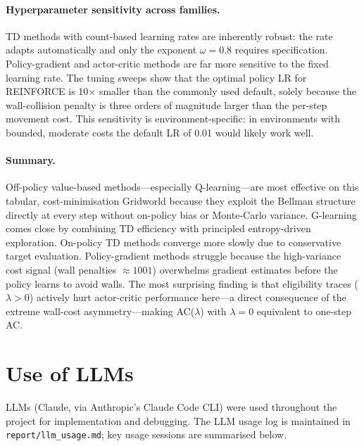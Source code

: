 \documentclass[11pt]{article}
\begin{document}
\paragraph{Hyperparameter sensitivity across families.}
TD methods with count-based learning rates are inherently robust: the rate
adapts automatically and only the exponent $\omega=0.8$ requires specification.
Policy-gradient and actor-critic methods are far more sensitive to the fixed
learning rate.  The tuning sweeps show that the optimal policy LR for REINFORCE
is 10$\times$ smaller than the commonly used default, solely because the
wall-collision penalty is three orders of magnitude larger than the per-step
movement cost.  This sensitivity is environment-specific: in environments with
bounded, moderate costs the default LR of 0.01 would likely work well.

\paragraph{Summary.}
Off-policy value-based methods—especially Q-learning—are most effective on this
tabular, cost-minimisation Gridworld because they exploit the Bellman structure
directly at every step without on-policy bias or Monte-Carlo variance.
G-learning comes close by combining TD efficiency with principled entropy-driven
exploration.  On-policy TD methods converge more slowly due to conservative
target evaluation.  Policy-gradient methods struggle because the high-variance
cost signal (wall penalties $\approx 1001$) overwhelms gradient estimates before
the policy learns to avoid walls.  The most surprising finding is that
eligibility traces ($\lambda>0$) actively hurt actor-critic performance
here---a direct consequence of the extreme wall-cost asymmetry---making
AC($\lambda$) with $\lambda=0$ equivalent to one-step AC.

\section{Use of LLMs}
\label{sec:llm}

LLMs (Claude, via Anthropic's Claude Code CLI) were used throughout the project
for implementation and debugging.  The LLM usage log is maintained in
\texttt{report/llm\_usage.md}; key usage sessions are summarised below.
\end{document}
